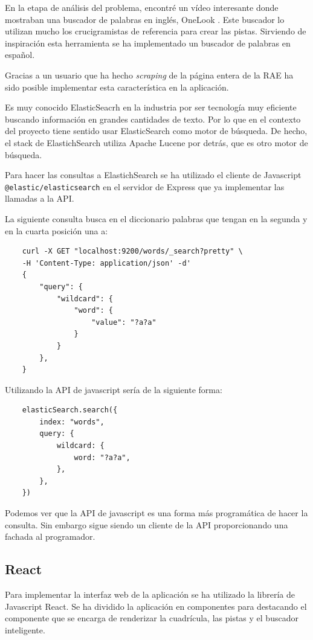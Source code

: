 \documentclass[12pt, a4paper]{article}
\begin{document}
En la etapa de análisis del problema, encontré un vídeo \cite{video:CreateXword}
interesante donde mostraban una buscador de palabras en inglés, OneLook \cite{OneLook}.
Este buscador lo utilizan mucho los crucigramistas de referencia para crear las pistas.
Sirviendo de inspiración esta herramienta se ha implementado un buscador de
palabras en español.

Gracias a un usuario que ha hecho \textit{scraping} de la página entera de la RAE \cite{repoDic}
ha sido posible implementar esta característica en la aplicación.

Es muy conocido ElasticSeacrh en la industria por ser tecnología muy eficiente buscando
información en grandes cantidades de texto. Por lo que en el contexto del proyecto tiene sentido
usar ElasticSearch como motor de búsqueda. De hecho, el stack de ElastichSearch utiliza Apache
Lucene por detrás, que es otro motor de búsqueda.

Para hacer las consultas a ElastichSearch se ha utilizado el cliente de Javascript
\verb*|@elastic/elasticsearch| en el servidor de Express que ya implementar las llamadas
a la API.

La siguiente consulta busca en el diccionario palabras que tengan en la segunda y en
la cuarta posición una a:

\begin{verbatim}
	curl -X GET "localhost:9200/words/_search?pretty" \
	-H 'Content-Type: application/json' -d'
	{
		"query": {
			"wildcard": {
				"word": {
					"value": "?a?a"
				}
			}
		},
	}
\end{verbatim}

Utilizando la API de javascript sería de la siguiente forma:

\begin{verbatim}
	elasticSearch.search({
		index: "words",
		query: {
			wildcard: {
				word: "?a?a",
			},
		},
	})
\end{verbatim}

Podemos ver que la API de javascript es una forma más programática de hacer la consulta.
Sin embargo sigue siendo un cliente de la API proporcionando una fachada al programador.

\subsection{React}

Para implementar la interfaz web de la aplicación se ha utilizado la librería de Javascript
React. Se ha dividido la aplicación en componentes para destacando el componente que se
encarga de renderizar la cuadrícula, las pistas y el buscador inteligente.
\end{document}
